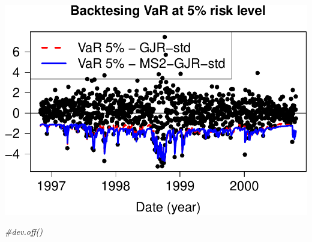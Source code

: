 \documentclass[
]{article}
\newenvironment{Shaded}{\begin{snugshade}}{\end{snugshade}}
\newcommand{\CommentTok}[1]{\textcolor[rgb]{0.56,0.35,0.01}{\textit{#1}}}
\begin{document}
\includegraphics{MS-GARCH_files/figure-latex/unnamed-chunk-14-1.pdf}

\begin{Shaded}
\begin{Highlighting}[]
\CommentTok{\#dev.off()}
\end{Highlighting}
\end{Shaded}
\end{document}
